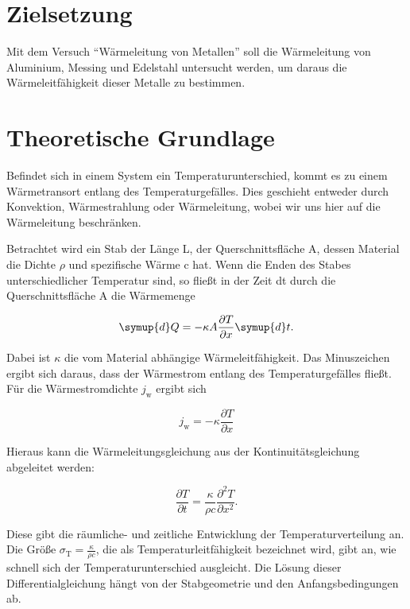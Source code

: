 \section{Zielsetzung}
    Mit dem Versuch "`Wärmeleitung von Metallen"' soll die Wärmeleitung von Aluminium, Messing und Edelstahl untersucht werden,
    um daraus die Wärmeleitfähigkeit dieser Metalle zu bestimmen.

    \section{Theoretische Grundlage}
      Befindet sich in einem System ein Temperaturunterschied, kommt es zu einem Wärmetransort entlang des Temperaturgefälles.
      Dies geschieht entweder durch Konvektion, Wärmestrahlung oder Wärmeleitung, wobei wir uns hier auf die Wärmeleitung beschränken.

      Betrachtet wird ein Stab der Länge L, der Querschnittsfläche A, dessen Material die Dichte $\rho$ und spezifische Wärme c hat. 
      Wenn die Enden des Stabes unterschiedlicher Temperatur sind, so fließt in der Zeit dt durch die Querschnittsfläche A die Wärmemenge

      \begin{equation}
      \symup{d}Q = - \kappa A \frac{\partial T}{\partial x} \symup{d}t .
        \label{eqn:waermemenge}
      \end{equation}

      Dabei ist $\kappa$ die vom Material abhängige Wärmeleitfähigkeit. 
      Das Minuszeichen ergibt sich daraus, dass der Wärmestrom entlang des Temperaturgefälles fließt.
      Für die Wärmestromdichte $j_\text{w}$ ergibt sich

      \begin{equation}
      j_\text{w}=-\kappa \frac{\partial T}{\partial x}
        \label{eqn:waermestromdichte}
      \end{equation}       
      
      Hieraus kann die Wärmeleitungsgleichung aus der Kontinuitätsgleichung abgeleitet werden:

      \begin{equation}
      \frac{\partial T}{\partial t} = \frac{\kappa}{\rho c} \frac{\partial^2 T}{\partial x^2}.
        \label{eqn:waermeleitungsgleichung}
      \end{equation}  

      Diese gibt die räumliche- und zeitliche Entwicklung der Temperaturverteilung an.
      Die Größe $\sigma_\text{T} = \frac{\kappa}{\rho c}$, 
      die als Temperaturleitfähigkeit bezeichnet wird, gibt an, wie schnell sich der Temperaturunterschied ausgleicht.
      Die Lösung dieser Differentialgleichung hängt von der Stabgeometrie und den Anfangsbedingungen ab.

